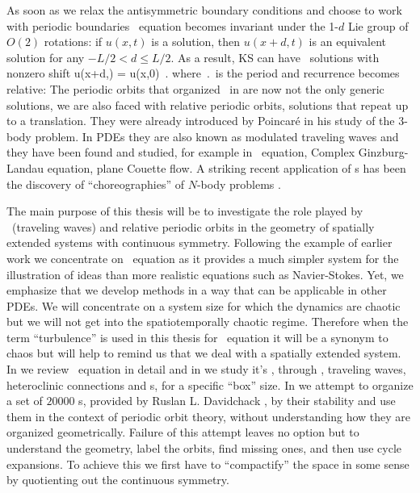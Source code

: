 %
As soon as
we relax the antisymmetric boundary conditions and choose to work with periodic boundaries
\KS\ equation becomes invariant under the 1-$d$ Lie group of $O(2)$ rotations: if
$u(x,t)$ is a solution, then $u(x+d,t)$ is an equivalent
solution for any $-L/2 < d \leq L/2$.
As a result,
KS can have \rpo\ solutions with nonzero shift
\beq
u(x+d,\period{}) = u(x,0)
\,.
where $\period{}$ is the period and recurrence becomes
relative: The periodic orbits that organized \statesp\ in
 are now not the
only generic solutions, we are also faced with relative
periodic orbits, solutions that repeat up to a
translation.
They were already introduced by Poincar\'e in his study of the
3-body problem. In PDEs they are also
known as modulated traveling waves and they have been found and
studied, for example in \KS\ equation, Complex
Ginzburg-Landau equation, plane Couette
flow. A striking recent application of \rpo s has
been the discovery of ``choreographies'' of $N$-body problems%
.

The main purpose of this thesis will be to investigate the role played by \reqva\ (traveling waves)
and relative periodic orbits in the geometry of spatially extended systems with continuous symmetry. Following
the example of earlier work we concentrate on \KS\ equation as it provides a much simpler system for the illustration
of ideas than more realistic equations such as Navier-Stokes. Yet, we emphasize that we develop methods in
a way that can be applicable in other PDEs. We will
concentrate on a system size for which the dynamics are chaotic
but we will not get into the spatiotemporally chaotic regime.
Therefore when the term ``turbulence'' is
used in this thesis for \KS\ equation it will be a synonym to chaos but will help
to remind us that we deal with a spatially extended system. In  we review \KS\ equation in detail
and in  we study it's \statesp, through \eqva, traveling waves, heteroclinic connections
and \rpo s, for a specific ``box'' size. In  we attempt to
organize a set of $20000$ \rpo s, provided by Ruslan L.
Davidchack , by their stability and use
them in the context of periodic orbit theory, without
understanding how they are organized geometrically. Failure of
this attempt leaves no option but to understand the geometry,
label the orbits, find missing ones, and then use cycle
expansions. To achieve this we first have to ``compactify'' the
space in some sense by quotienting out the continuous symmetry.

